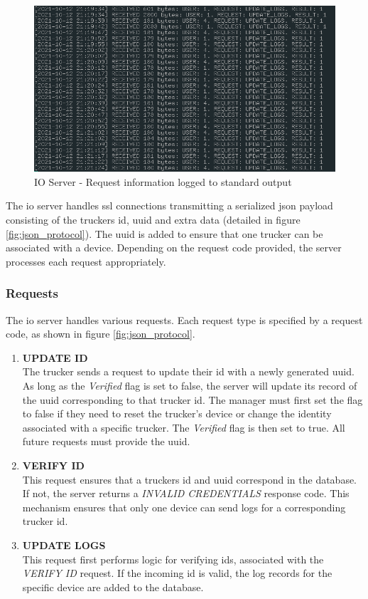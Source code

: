 \begin{figure}[H]
\centering
\includegraphics[scale=0.60]{io_output.png}
\caption{IO Server - Request information logged to standard output}
\label{fig:io_output}
\end{figure}

The \Ac{io} server handles \ac{ssl} connections transmitting a serialized \ac{json} payload consisting of the truckers \ac{id}, \ac{uuid} and extra data (detailed in figure \ref{fig:json_protocol}).
The \ac{uuid} is added to ensure that one trucker can be associated with a device.
Depending on the request code provided, the server processes each request appropriately.

\subsubsection{Requests}
The \ac{io} server handles various requests.
Each request type is specified by a request code, as shown in figure \ref{fig:json_protocol}.
\begin{enumerate}
\item \textbf{UPDATE ID}\\
The trucker sends a request to update their \ac{id} with a newly generated \ac{uuid}.
As long as the \textit{Verified} flag is set to false, the server will update its record of the \ac{uuid} corresponding to that trucker \ac{id}.
The manager must first set the flag to false if they need to reset the trucker's device or change the identity associated with a specific trucker.
The \textit{Verified} flag is then set to true.
All future requests must provide the \ac{uuid}.

\item \textbf{VERIFY ID}\\
This request ensures that a truckers \ac{id} and \ac{uuid} correspond in the database.
If not, the server returns a \textit{INVALID CREDENTIALS} response code.
This mechanism ensures that only one device can send logs for a corresponding trucker \ac{id}.

\item \textbf{UPDATE LOGS}\\
This request first performs logic for verifying \ac{id}s, associated with the \textit{VERIFY ID} request.
If the incoming \ac{id} is valid, the log records for the specific device are added to the database.
\end{enumerate}

